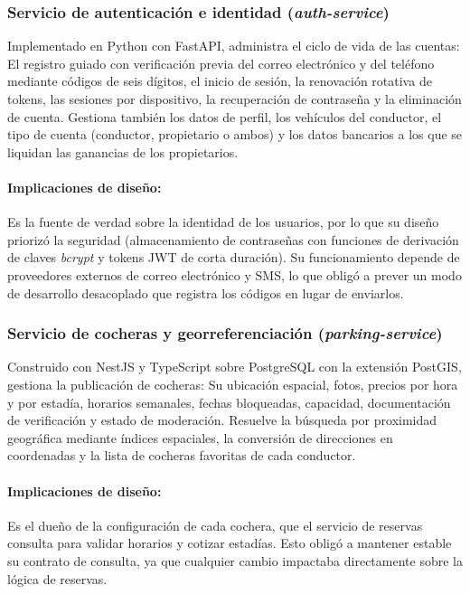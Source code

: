 \subsubsection{Servicio de autenticación e identidad (\textit{auth-service})}

Implementado en Python con FastAPI, administra el ciclo de vida de las cuentas: El registro guiado con verificación previa del correo electrónico y del teléfono mediante códigos de seis dígitos, el inicio de sesión, la renovación rotativa de tokens, las sesiones por dispositivo, la recuperación de contraseña y la eliminación de cuenta. Gestiona también los datos de perfil, los vehículos del conductor, el tipo de cuenta (conductor, propietario o ambos) y los datos bancarios a los que se liquidan las ganancias de los propietarios.

\paragraph{Implicaciones de diseño:} Es la fuente de verdad sobre la identidad de los usuarios, por lo que su diseño priorizó la seguridad (almacenamiento de contraseñas con funciones de derivación de claves \textit{bcrypt} y tokens JWT de corta duración). Su funcionamiento depende de proveedores externos de correo electrónico y SMS, lo que obligó a prever un modo de desarrollo desacoplado que registra los códigos en lugar de enviarlos.

\subsubsection{Servicio de cocheras y georreferenciación (\textit{parking-service})}

Construido con NestJS y TypeScript sobre PostgreSQL con la extensión PostGIS, gestiona la publicación de cocheras: Su ubicación espacial, fotos, precios por hora y por estadía, horarios semanales, fechas bloqueadas, capacidad, documentación de verificación y estado de moderación. Resuelve la búsqueda por proximidad geográfica mediante índices espaciales, la conversión de direcciones en coordenadas y la lista de cocheras favoritas de cada conductor.

\paragraph{Implicaciones de diseño:} Es el dueño de la configuración de cada cochera, que el servicio de reservas consulta para validar horarios y cotizar estadías. Esto obligó a mantener estable su contrato de consulta, ya que cualquier cambio impactaba directamente sobre la lógica de reservas.

